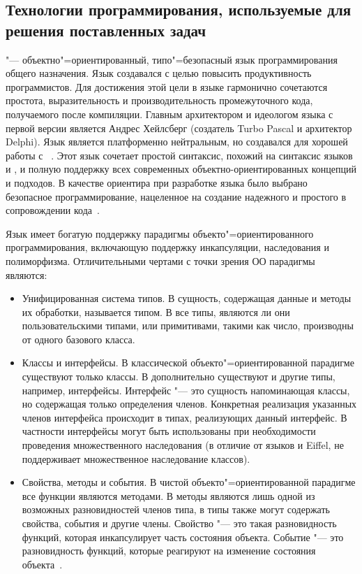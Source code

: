 \subsection{Технологии программирования, используемые для решения поставленных задач}
\label{sub:theory_and_motivation:tech}
\csharp{} "--- объектно"=ориентированный, типо"=безопасный язык программирования общего назначения.
Язык создавался с целью повысить продуктивность программистов.
Для достижения этой цели в языке гармонично сочетаются простота, выразительность и производительность промежуточного кода, получаемого после компиляции.
Главным архитектором и идеологом языка с первой версии является Андрес Хейлсберг (создатель Turbo Pascal и архитектор Delphi).
Язык \csharp{} является платформенно нейтральным, но создавался для хорошей работы с \dotnet{}~\cite{albahari_2012_en}.
Этот язык сочетает простой синтаксис, похожий на синтаксис языков \cpp{} и \java{}, и полную поддержку всех современных объектно-ориентированных концепций и подходов. В качестве ориентира при разработке языка было выбрано безопасное программирование, нацеленное на создание надежного и простого в сопровождении кода~\cite{volosevich_cs_2011}.

Язык имеет богатую поддержку парадигмы объекто"=ориентированного программирования, включающую поддержку инкапсуляции, наследования и полиморфизма.
Отличительными чертами \csharp{} с точки зрения ОО парадигмы являются:
\begin{itemize}
  \item Унифицированная система типов. 
        В \csharp{} сущность, содержащая данные и методы их обработки, называется типом.
        В \csharp{} все типы, являются ли они пользовательскими типами, или примитивами, такими как число, производны от одного базового класса.
  \item Классы и интерфейсы.
        В классической объекто"=ориентированной парадигме существуют только классы.
        В \csharp{} дополнительно существуют и другие типы, например, интерфейсы.
        Интерфейс "--- это сущность напоминающая классы, но содержащая только определения членов.
        Конкретная реализация указанных членов интерфейса происходит в типах, реализующих данный интерфейс.
        В частности интерфейсы могут быть использованы при необходимости проведения множественного наследования (в отличие от языков \cpp{} и Eiffel, \csharp{} не поддерживает множественное наследование классов).
  \item Свойства, методы и события.
        В чистой объекто"=ориентированной парадигме все функции являются методами.
        В \csharp{} методы являются лишь одной из возможных разновидностей членов типа, в \csharp{} типы также могут содержать свойства, события и другие члены.
        Свойство "--- это такая разновидность функций, которая инкапсулирует часть состояния объекта.
        Событие "--- это разновидность функций, которые реагируют на изменение состояния объекта~\cite{albahari_2012_en}.
\end{itemize}

